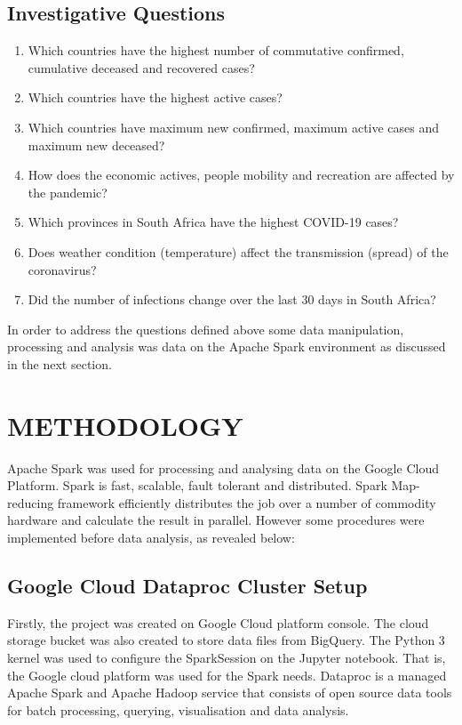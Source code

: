 \documentclass[12pt]{article}
\begin{document}
\subsection{Investigative Questions}

\begin{enumerate}
    \item Which  countries have the highest number of commutative confirmed, cumulative deceased and recovered cases?
    \item  Which countries have the highest active cases?
    \item Which countries have maximum new confirmed, maximum active cases and maximum new deceased?
    \item How does the economic actives, people mobility and recreation are affected by the pandemic?
    \item Which provinces in South Africa have the  highest COVID-19 cases?
    \item Does weather condition (temperature) affect the transmission (spread) of the coronavirus?
    \item Did the number of infections change over the last 30 days in  South Africa?
\end{enumerate}

In order to address the questions  defined above  some  data manipulation, processing and analysis was data on the  Apache Spark environment as discussed in the next section.

\section{METHODOLOGY}
Apache Spark was used for processing and analysing data on the Google Cloud Platform. Spark is fast, scalable, fault tolerant and distributed. Spark Map-reducing framework efficiently distributes the job over a number of commodity hardware and calculate the result in parallel. However some procedures were implemented before data analysis, as revealed below:

\subsection{ Google Cloud Dataproc Cluster Setup}
Firstly, the project was created on Google Cloud platform console. The cloud storage bucket was also created to store data files from BigQuery. The Python 3 kernel was used to configure the SparkSession on the Jupyter notebook.  That is, the Google cloud platform was used for the Spark needs. Dataproc is a managed Apache Spark and Apache Hadoop service that consists of open source data tools for batch processing, querying, visualisation and data analysis.
\end{document}
